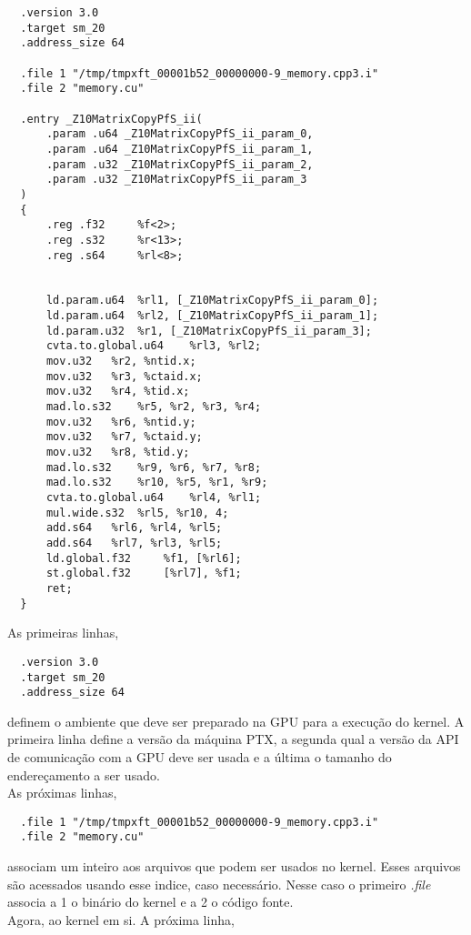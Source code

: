 \begin{lstlisting}
  .version 3.0
  .target sm_20
  .address_size 64

  .file	1 "/tmp/tmpxft_00001b52_00000000-9_memory.cpp3.i"
  .file	2 "memory.cu"

  .entry _Z10MatrixCopyPfS_ii(
	  .param .u64 _Z10MatrixCopyPfS_ii_param_0,
	  .param .u64 _Z10MatrixCopyPfS_ii_param_1,
	  .param .u32 _Z10MatrixCopyPfS_ii_param_2,
	  .param .u32 _Z10MatrixCopyPfS_ii_param_3
  )
  {
	  .reg .f32 	%f<2>;
	  .reg .s32 	%r<13>;
	  .reg .s64 	%rl<8>;


	  ld.param.u64 	%rl1, [_Z10MatrixCopyPfS_ii_param_0];
	  ld.param.u64 	%rl2, [_Z10MatrixCopyPfS_ii_param_1];
	  ld.param.u32 	%r1, [_Z10MatrixCopyPfS_ii_param_3];
	  cvta.to.global.u64 	%rl3, %rl2;
	  mov.u32 	%r2, %ntid.x;
	  mov.u32 	%r3, %ctaid.x;
	  mov.u32 	%r4, %tid.x;
	  mad.lo.s32 	%r5, %r2, %r3, %r4;
	  mov.u32 	%r6, %ntid.y;
	  mov.u32 	%r7, %ctaid.y;
	  mov.u32 	%r8, %tid.y;
	  mad.lo.s32 	%r9, %r6, %r7, %r8;
	  mad.lo.s32 	%r10, %r5, %r1, %r9;
	  cvta.to.global.u64 	%rl4, %rl1;
	  mul.wide.s32 	%rl5, %r10, 4;
	  add.s64 	%rl6, %rl4, %rl5;
	  add.s64 	%rl7, %rl3, %rl5;
	  ld.global.f32 	%f1, [%rl6];
	  st.global.f32 	[%rl7], %f1;
	  ret;
  }
\end{lstlisting}

As primeiras linhas,

\begin{lstlisting}
  .version 3.0
  .target sm_20
  .address_size 64
\end{lstlisting}

definem o ambiente que deve ser preparado na GPU para a execução do kernel. A primeira linha define a versão da máquina PTX, a segunda
qual a versão da API de comunicação com a GPU deve ser usada e a última o tamanho do endereçamento a ser usado. \\
As próximas linhas, 

\begin{lstlisting}
  .file	1 "/tmp/tmpxft_00001b52_00000000-9_memory.cpp3.i"
  .file	2 "memory.cu"
\end{lstlisting}

associam um inteiro aos arquivos que podem ser usados no kernel. Esses arquivos são acessados usando esse indice, caso necessário.
Nesse caso o primeiro \textit{.file} associa a 1 o binário do kernel e a 2 o código fonte. \\

Agora, ao kernel em si. A próxima linha,


